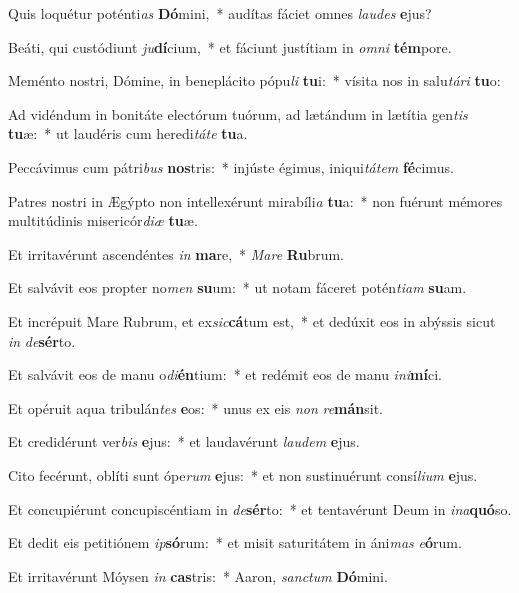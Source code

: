 \item Quis loquétur poténti\textit{as} \textbf{Dó}mini,~* audítas fáciet omnes \textit{lau}\textit{des} \textbf{e}jus?
\item Beáti, qui custódiunt \textit{ju}\textbf{dí}cium,~* et fáciunt justítiam in \textit{om}\textit{ni} \textbf{tém}pore.
\item Meménto nostri, Dómine, in beneplácito pópu\textit{li} \textbf{tu}i:~* vísita nos in salu\textit{tá}\textit{ri} \textbf{tu}o:
\item Ad vidéndum in bonitáte electórum tuórum, ad lætándum in lætítia gen\textit{tis} \textbf{tu}æ:~* ut laudéris cum heredi\textit{tá}\textit{te} \textbf{tu}a.
\item Peccávimus cum pátri\textit{bus} \textbf{nos}tris:~* injúste égimus, iniqui\textit{tá}\textit{tem} \textbf{fé}cimus.
\item Patres nostri in Ægýpto non intellexérunt mirabíli\textit{a} \textbf{tu}a:~* non fuérunt mémores multitúdinis misericór\textit{di}\textit{æ} \textbf{tu}æ.
\item Et irritavérunt ascendéntes \textit{in} \textbf{ma}re,~* \textit{Ma}\textit{re} \textbf{Ru}brum.
\item Et salvávit eos propter no\textit{men} \textbf{su}um:~* ut notam fáceret potén\textit{ti}\textit{am} \textbf{su}am.
\item Et incrépuit Mare Rubrum, et ex\textit{sic}\textbf{cá}tum est,~* et dedúxit eos in abýssis sicut \textit{in} \textit{de}\textbf{sér}to.
\item Et salvávit eos de manu o\textit{di}\textbf{én}tium:~* et redémit eos de manu \textit{in}\textit{i}\textbf{mí}ci.
\item Et opéruit aqua tribulán\textit{tes} \textbf{e}os:~* unus ex eis \textit{non} \textit{re}\textbf{mán}sit.
\item Et credidérunt ver\textit{bis} \textbf{e}jus:~* et laudavérunt \textit{lau}\textit{dem} \textbf{e}jus.
\item Cito fecérunt, oblíti sunt ópe\textit{rum} \textbf{e}jus:~* et non sustinuérunt consí\textit{li}\textit{um} \textbf{e}jus.
\item Et concupiérunt concupiscéntiam in \textit{de}\textbf{sér}to:~* et tentavérunt Deum in \textit{in}\textit{a}\textbf{quó}so.
\item Et dedit eis petitiónem \textit{ip}\textbf{só}rum:~* et misit saturitátem in áni\textit{mas} \textit{e}\textbf{ó}rum.
\item Et irritavérunt Móysen \textit{in} \textbf{cas}tris:~* Aaron, \textit{sanc}\textit{tum} \textbf{Dó}mini.
